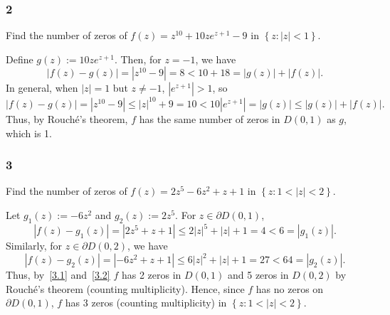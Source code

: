 \documentclass[12pt]{article}
\begin{document}
\newpage
\subsubsection*{2}
\begin{tcolorbox}
  Find the number of zeros of $f(z) = z^{10} + 10ze^{z + 1} - 9$ in $\left\{ z : |z| < 1 \right\}$.
\end{tcolorbox}
Define $g(z) := 10ze^{z+1}$. Then, for $z = -1$, we have
\[ |f(z) - g(z)| = |z^{10} - 9| = 8 < 10 + 18 = |g(z)| + |f(z)|. \]
In general, when $|z| = 1$ but $z \neq -1$, $|e^{z + 1}| > 1$, so
\[ |f(z) - g(z)| = |z^{10} - 9| \leq |z|^{10} + 9 = 10 < 10|e^{z+1}| = |g(z)| \leq |g(z)| + |f(z)|. \]
Thus, by Rouch\'{e}'s theorem, $f$ has the same number of zeros in $D(0,1)$ as $g$, which is 1.

\subsubsection*{3}
\begin{tcolorbox}
  Find the number of zeros of $f(z) = 2z^5 - 6z^2 + z + 1$ in $\left\{ z : 1 < |z| < 2 \right\}$.
\end{tcolorbox}
Let $g_1(z) := -6z^2$ and $g_2(z) := 2z^5$. For $z \in \partial D(0,1)$,
\begin{equation}
  |f(z) - g_1(z)| = |2z^5 + z + 1| \leq 2|z|^5 + |z| + 1 = 4 < 6 = |g_1(z)|.
  \label{3.1}
\end{equation}
Similarly, for $z \in \partial D(0,2)$, we have 
\begin{equation}
  |f(z) - g_2(z)| = |-6z^2 + z + 1| \leq 6|z|^2 + |z| + 1 = 27 < 64 = |g_2(z)|.
  \label{3.2}
\end{equation}
Thus, by~\eqref{3.1} and~\eqref{3.2} $f$ has 2 zeros in $D(0,1)$ and 5 zeros in $D(0,2)$ by Rouch\'{e}'s theorem (counting multiplicity). Hence, since
$f$ has no zeros on $\partial D(0,1)$, $f$ has 3 zeros (counting multiplicity) in $\left\{ z : 1 < |z| < 2 \right\}$.
\end{document}
